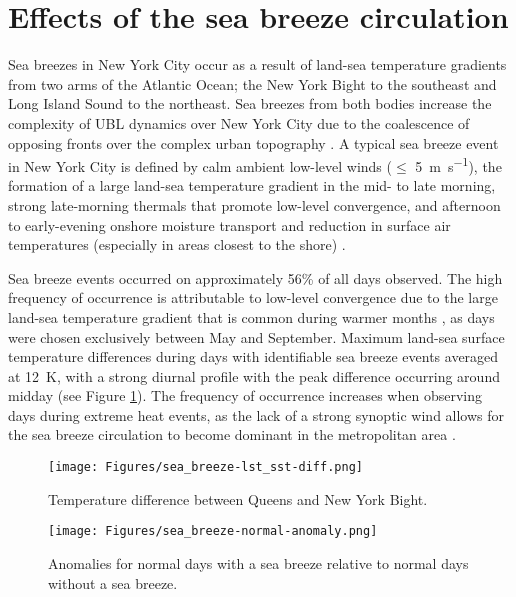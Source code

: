 \section{Effects of the sea breeze circulation} \label{section:sea_breeze_effects} 
Sea breezes in New York City occur as a result of land-sea temperature gradients from two arms of the Atlantic Ocean; the New York Bight to the southeast and Long Island Sound to the northeast. Sea breezes from both bodies increase the complexity of UBL dynamics over New York City due to the coalescence of opposing fronts over the complex urban topography \citep{bornstein1981}. A typical sea breeze event in New York City is defined by calm ambient low-level winds ($\leq$ \SI{5}{\meter\per\second}), the formation of a large land-sea temperature gradient in the mid- to late morning, strong late-morning thermals that promote low-level convergence, and afternoon to early-evening onshore moisture transport and reduction in surface air temperatures (especially in areas closest to the shore) \citep{childs2005, frizzola1963, gedzelman2003}. 

Sea breeze events occurred on approximately 56\% of all days observed. The high frequency of occurrence is  attributable to low-level convergence due to the large land-sea temperature gradient that is common during warmer months \citep{childs2005, gedzelman2003, thompson2007}, as days were chosen exclusively between May and September. Maximum land-sea surface temperature differences during days with identifiable sea breeze events averaged at \SI{12}{\kelvin}, with a strong diurnal profile with the peak difference occurring around midday (see Figure \ref{fig:sea_breeze-lst_sst-diff}). The frequency of occurrence increases when observing days during extreme heat events, as the lack of a strong synoptic wind allows for the sea breeze circulation to become dominant in the metropolitan area \citep{miller2003}. 

\begin{figure}[ht]
	\centering
	\texttt{[image: Figures/sea\_breeze-lst\_sst-diff.png]}
	\caption{Temperature difference between Queens and New York Bight.}
	\label{fig:sea_breeze-lst_sst-diff}
\end{figure}

\begin{figure}[ht]
	\centering
	\texttt{[image: Figures/sea\_breeze-normal-anomaly.png]}
	\caption{Anomalies for normal days with a sea breeze relative to normal days without a sea breeze.}
	\label{fig:sea_breeze_normal-normal-anomaly}
\end{figure}

